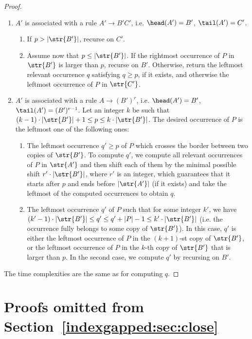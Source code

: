 \begin{proof}
\begin{enumerate}
\item $A'$ is associated with a rule $A' \rightarrow B'C'$, i.e. $\head(A') = B'$, $\tail(A') = C'$. 
\begin{enumerate}
\item If $p > |\str{B'}|$, recurse on $C'$. 
\item Assume now that $p \leq |\str{B'}|$. If the rightmost  occurrence of $P$ in $\str{B'}$ is larger than $p$, recurse on $B'$. Otherwise, return the leftmost relevant occurrence $q$ satisfying $q\geq p$, if it exists, and otherwise the leftmost occurrence of $P$ in $\str{C'}$. %
\end{enumerate}
\item $A'$ is associated with a rule $A \rightarrow (B')^r$, i.e. $\head(A') = B'$, $\tail(A') = (B')^{r-1}$.  Let an integer $k$ be such that $(k-1) \cdot |\str{B'}|+1 \le p \le k \cdot |\str{B'}|$. The desired occurrence of $P$ is the leftmost one of the following ones:
\begin{enumerate}
	\item The leftmost occurrence $q' \geq p$ of $P$ which crosses the border between two copies of $\str{B'}$. To compute $q'$, we compute all relevant occurrences of $P$ in $\str{A'}$ and then shift each of them by the minimal possible shift $r' \cdot |\str{B'}|$, where $r'$ is an integer, which guarantees that it starts after $p$ and ends before $|\str{A'}|$ (if it exists) and take the leftmost of the computed occurrences to obtain $q$.
	\item The leftmost occurrence $q'$ of $P$ such that for some integer $k'$, we have $(k'-1) \cdot |\str{B'}| \le q' \le q'+|P|-1 \le k' \cdot |\str{B'}|$ (i.e. the occurrence fully belongs to some copy of $\str{B'}$). In this case, $q'$ is either the leftmost occurrence of $P$ in the $(k+1)$-st copy of $\str{B'}$, or the leftmost occurrence of $P$ in the $k$-th copy of $\str{B'}$ that is larger than $p$. In the second case, we compute $q'$ by recursing on $B'$.
	\end{enumerate}
\end{enumerate}
The time complexities are the same as for computing $q$.
\end{proof}

\section{Proofs omitted from Section~\ref{indexgapped:sec:close}}
\label{app:close}

